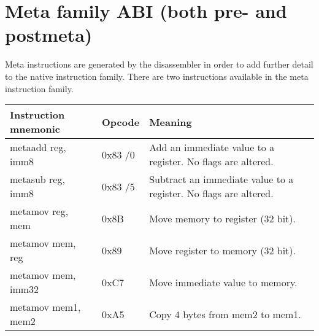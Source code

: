 \documentclass[12pt]{report}
\begin{document}
\section{Meta family ABI (both pre- and postmeta)}
\label{sec:meta-family-abi}
Meta instructions are generated by the disassembler in order to add further detail to the native instruction family. There are two instructions available in the meta instruction family.\\
\newline
\begin{tabular}{| l | l | l |}
	\hline
	\textbf{Instruction mnemonic} & \textbf{Opcode} & \textbf{Meaning}\\ \hline
	metaadd reg, imm8 & 0x83 /0 & Add an immediate value to a register. No flags are altered.\\ \hline
	metasub reg, imm8 & 0x83 /5 & Subtract an immediate value to a register. No flags are altered.\\ \hline
	metamov reg, mem & 0x8B & Move memory to register (32 bit).\\ \hline
	metamov mem, reg & 0x89 & Move register to memory (32 bit).\\ \hline
	metamov mem, imm32 & 0xC7 & Move immediate value to memory.\\ \hline
	metamov mem1, mem2 & 0xA5 & Copy 4 bytes from mem2 to mem1.\\ \hline
\end{tabular}
\end{document}
